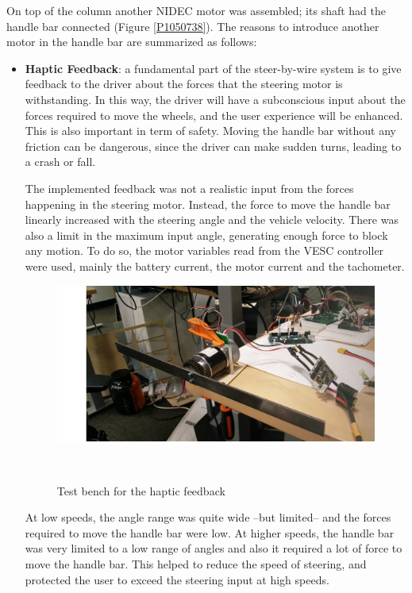 On top of the column another NIDEC motor was assembled; its shaft had the handle bar connected (Figure \ref{P1050738}). The reasons to introduce another motor in the handle bar are summarized as follows:
\begin{itemize}
\begin{itemize}
	\item \textbf{Haptic Feedback}: a fundamental part of the steer-by-wire system is to give feedback to the driver about the forces that the steering motor is withstanding. In this way, the driver will have a subconscious input about the forces required to move the wheels, and the user experience will be enhanced. 
	\newpage
	This is also important in term of safety. Moving the handle bar without any friction can be dangerous, since the driver can make sudden turns, leading to a crash or fall.
	
	The implemented feedback was not a realistic input from the forces happening in the steering motor. Instead, the force to move the handle bar linearly increased with the steering angle and the vehicle velocity. There was also a limit in the maximum input angle, generating enough force to block any motion. To do so, the motor variables read from the VESC controller were used, mainly the battery current, the motor current and the tachometer.
	
\begin{figure}[h!]
	\includegraphics[width=1\linewidth]{figs/05/IMG_20170123_121416}
	\caption{Test bench for the haptic feedback}
	\\[-1cm]
\end{figure}
	At low speeds, the angle range was quite wide --but limited-- and the forces required to move the handle bar were low. At higher speeds, the handle bar was very limited to a low range of angles and also it required a lot of force to move the handle bar.	This helped to reduce the speed of steering, and protected the user to exceed the steering input at high speeds.
	

\end{itemize}
\end{itemize}
